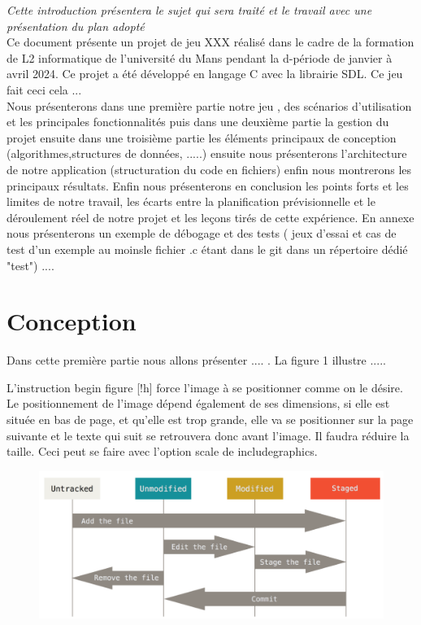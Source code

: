 \documentclass[12pt,a4paper, twoside]{article}
\begin{document}
\emph{Cette introduction présentera le sujet qui sera traité et le travail avec une présentation du plan adopté} \\
Ce document présente un projet de jeu XXX réalisé dans le cadre de la formation de L2 informatique de l’université du Mans pendant la d-période de janvier à avril 2024. Ce projet a été développé en langage C avec la librairie SDL. Ce jeu fait ceci cela ... \\Nous présenterons dans une première partie notre jeu , des scénarios d’utilisation et les principales fonctionnalités puis dans une deuxième partie la gestion du projet ensuite dans une troisième partie les éléments principaux de conception (algorithmes,structures de données, .....) ensuite nous présenterons l’architecture de notre application (structuration du code en fichiers) enfin nous montrerons les principaux résultats. Enfin nous présenterons en conclusion les points forts et les limites de notre travail, les écarts entre la planification prévisionnelle et le déroulement réel de notre projet et les leçons tirés de cette expérience. En annexe nous présenterons un exemple de débogage et des tests ( jeux d’essai et cas de test d’un exemple au moinsle fichier .c étant dans le git dans un répertoire dédié "test") ....
\section{Conception}
    Dans cette première partie nous allons présenter .... . La figure 1 illustre .....

    L’instruction \/begin figure [!h] force l’image à se positionner comme on le désire. Le positionnement de l’image dépend également de ses dimensions, si elle est située en bas de page, et qu’elle est trop grande, elle va se positionner sur la page suivante et le texte qui suit se retrouvera donc avant l’image. Il faudra réduire la taille. Ceci peut se faire avec l’option scale de includegraphics.
\newpage


\begin{figure}[h]
    \centering
    \includegraphics[width=1\textwidth]{image.png}
    \label{fig:logo}
\end{figure}
\end{document}
